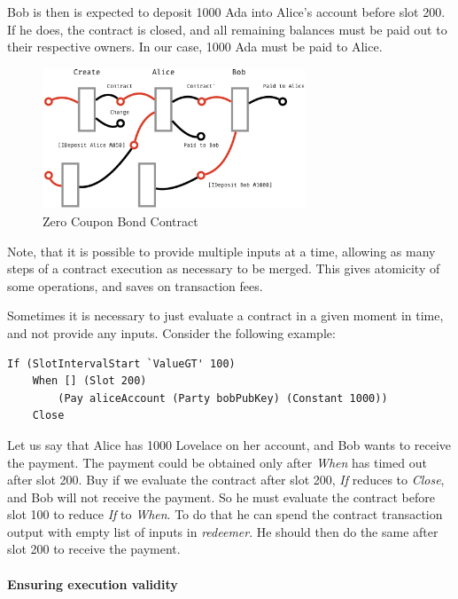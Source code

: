 \documentclass[runningheads]{llncs}
\begin{document}
\noindent
Bob is then is expected to deposit 1000 Ada into Alice's account before slot 200.
If he does, the contract is closed, and all remaining balances must be paid out
to their respective owners. In our case, 1000 Ada must be paid to Alice.

\begin{figure}[!h]
    \centering
    \includegraphics[width=0.7\textwidth]{figures/Marlowe3-Figures-004.jpeg}
    \caption{Zero Coupon Bond Contract}
    \label{fig:zero-coupon-bond}
\end{figure}

Note, that it is possible to provide multiple inputs at a time,
allowing as many steps of a contract execution as necessary to be merged.
This gives atomicity of some operations, and saves on transaction fees.

Sometimes it is necessary to just evaluate a contract in a given moment in time,
and not provide any inputs. Consider the following example:

\begin{verbatim}
If (SlotIntervalStart `ValueGT' 100)
    When [] (Slot 200)
        (Pay aliceAccount (Party bobPubKey) (Constant 1000))
    Close
\end{verbatim}

Let us say that Alice has 1000 Lovelace on her account, and Bob wants to receive the payment.
The payment could be obtained only after \emph{When} has timed out after slot 200.
Buy if we evaluate the contract after slot 200, \emph{If} reduces to \emph{Close}, and
Bob will not receive the payment. So he must evaluate the contract before slot 100 to
reduce \emph{If} to \emph{When}.
To do that he can spend the contract transaction output with empty list of inputs in \emph{redeemer}.
He should then do the same after slot 200 to receive the payment.


\paragraph{Ensuring execution validity}
\end{document}
